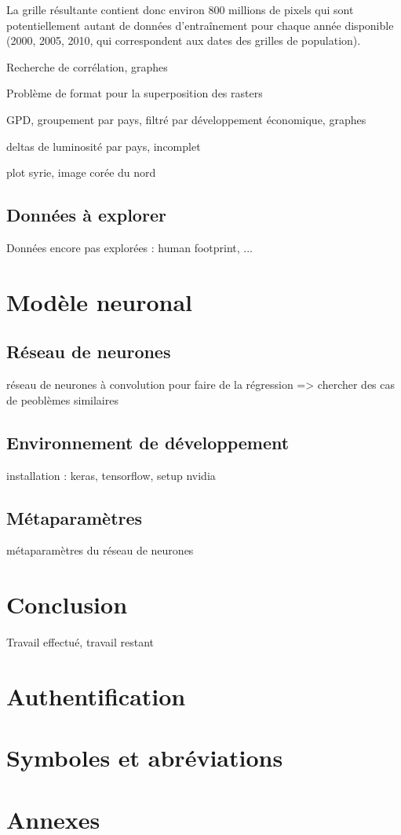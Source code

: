 \documentclass[a4paper]{report}
\begin{document}

La grille résultante contient donc environ 800 millions de pixels qui sont potentiellement autant de données d'entraînement pour chaque année disponible (2000, 2005, 2010, qui correspondent aux dates des grilles de population).

Recherche de corrélation, graphes

Problème de format pour la superposition des rasters

GPD, groupement par pays, filtré par développement économique, graphes

deltas de luminosité par pays, incomplet

plot syrie, image corée du nord

\section{Données à explorer}
Données encore pas explorées : human footprint, ...

\chapter{Modèle neuronal}
\section{Réseau de neurones}
réseau de neurones à convolution pour faire de la régression => chercher des cas de peoblèmes similaires

\section{Environnement de développement}
installation : keras, tensorflow, setup nvidia

\section{Métaparamètres}
métaparamètres du réseau de neurones

\chapter{Conclusion}
Travail effectué, travail restant

\printbibliography

\chapter{Authentification}


\chapter{Symboles et abréviations}


\listoffigures

\chapter{Annexes}
\end{document}
